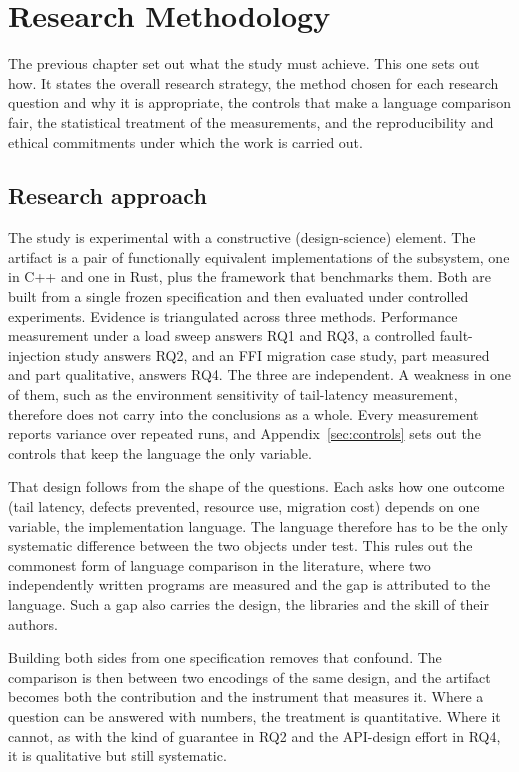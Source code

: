 \documentclass[english,oneside,a4paper,censored,csm,software-track-2020]{HYthesisML}
\begin{document}
\chapter{Research Methodology\label{chapter:methodology}}

The previous chapter set out what the study must achieve. This one sets out how. It states
the overall research strategy, the method chosen for each research question and why it is
appropriate, the controls that make a language comparison fair, the statistical treatment of
the measurements, and the reproducibility and ethical commitments under which the work is
carried out.

\section{Research approach}\label{sec:approach}
The study is experimental with a constructive (design-science) element. The artifact is a pair
of functionally equivalent implementations of the subsystem, one in C++ and one in Rust, plus
the framework that benchmarks them. Both are built from a single frozen specification and then
evaluated under controlled experiments. Evidence is triangulated across three methods.
Performance measurement under a load sweep answers RQ1 and RQ3, a controlled fault-injection
study answers RQ2, and an FFI migration case study, part measured and part qualitative, answers
RQ4. The three are independent. A weakness in one of them, such as the environment sensitivity
of tail-latency measurement, therefore does not carry into the conclusions as a whole. Every
measurement reports variance over repeated runs, and Appendix~\ref{sec:controls} sets out the
controls that keep the language the only variable.

That design follows from the shape of the questions. Each asks how one outcome (tail latency,
defects prevented, resource use, migration cost) depends on one variable, the implementation
language. The language therefore has to be the only systematic difference between the two
objects under test. This rules out the commonest form of language comparison in the literature,
where two independently written programs are measured and the gap is attributed to the language.
Such a gap also carries the design, the libraries and the skill of their authors.

Building both sides from one specification removes that confound. The comparison is then between
two encodings of the same design, and the artifact becomes both the contribution and the
instrument that measures it. Where a question can be answered with numbers, the treatment is
quantitative. Where it cannot, as with the kind of guarantee in RQ2 and the API-design effort in
RQ4, it is qualitative but still systematic.
\end{document}
